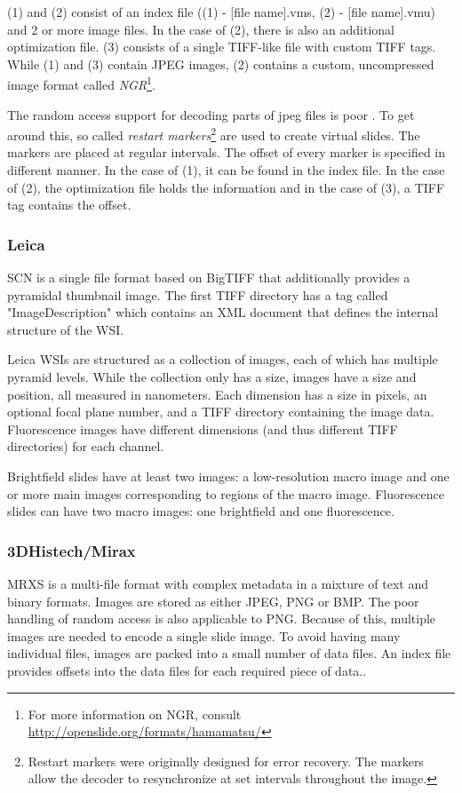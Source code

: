 (1) and (2) consist of an index file ((1) - [file name].vms, (2) - [file name].vmu) and 2 or more image files. In the case of (2), there is also an additional optimization file. (3) consists of a single TIFF-like file with custom TIFF tags. While (1) and (3) contain JPEG images, (2) contains a custom, uncompressed image format called \emph{NGR}\footnote{For more information on NGR, consult \url{http://openslide.org/formats/hamamatsu/}}\cite{web:openslide}.

The random access support for decoding parts of jpeg files is poor \cite{web:openslide}. To get around this, so called \emph{restart markers}\footnote{Restart markers were originally designed for error recovery. The markers allow the decoder to resynchronize at set intervals throughout the image\cite{Goode13}.} are used to create virtual slides\cite{Goode13}. The markers are placed at regular intervals. The offset of every marker is specified in different manner. In the case of (1), it can be found in the index file. In the case of (2), the optimization file holds the information and in the case of (3), a TIFF tag contains the offset\cite{web:openslide}.


\subsubsection{Leica}
SCN is a single file format based on BigTIFF that additionally provides a pyramidal thumbnail image\cite{Goode13}. The first TIFF directory has a tag called "ImageDescription" which contains an XML document that defines the internal structure of the WSI\cite{web:openslide}.

Leica WSIs are structured as a collection of images, each of which has multiple pyramid levels. While the collection only has a size, images have a size and position, all measured in nanometers. Each dimension has a size in pixels, an optional focal plane number, and a TIFF directory containing the image data. Fluorescence images have different dimensions (and thus different TIFF directories) for each channel\cite{web:openslide}.

Brightfield slides have at least two images: a low-resolution macro image and one or more main images corresponding to regions of the macro image. Fluorescence slides can have two macro images: one brightfield and one fluorescence\cite{web:openslide}.


\subsubsection{3DHistech/Mirax}
MRXS is a multi-file format with complex metadata in a mixture of text and binary formats. Images are stored as either JPEG, PNG or BMP\cite{Goode13}. The poor handling of random access is also applicable to PNG. Because of this, multiple images are needed to encode a single slide image. To avoid having many individual files, images are packed into a small number of data files. An index file provides offsets into the data files for each required piece of data.\cite{web:openslide}. 

